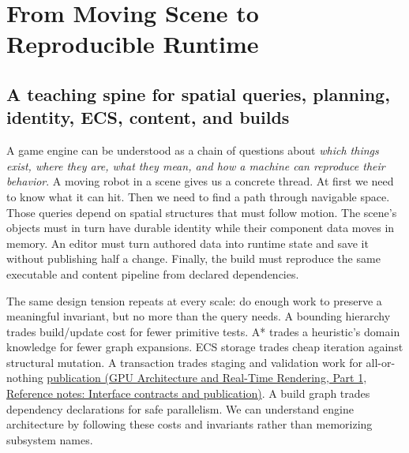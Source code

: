\section{From Moving Scene to Reproducible Runtime}\label{05-engine-i-ch008-from-moving-scene-to-reproducible-runtime}

\hypertarget{05-engine-i-ch008-from-moving-scene-to-reproducible-runtime}{}

\subsection{A teaching spine for spatial queries, planning, identity, ECS, content, and builds}\label{05-engine-i-ch008-a-teaching-spine-for-spatial-queries-planning-identity-ecs-content-and-builds}

\hypertarget{05-engine-i-ch008-a-teaching-spine-for-spatial-queries-planning-identity-ecs-content-and-builds}{}

A game engine can be understood as a chain of questions about \emph{which things exist, where they are, what they mean, and how a machine can reproduce their behavior}. A moving robot in a scene gives us a concrete thread. At first we need to know what it can hit. Then we need to find a path through navigable space. Those queries depend on spatial structures that must follow motion. The scene's objects must in turn have durable identity while their component data moves in memory. An editor must turn authored data into runtime state and save it without publishing half a change. Finally, the build must reproduce the same executable and content pipeline from declared dependencies.

The same design tension repeats at every scale: do enough work to preserve a meaningful invariant, but no more than the query needs. A bounding hierarchy trades build/update cost for fewer primitive tests. A* trades a heuristic's domain knowledge for fewer graph expansions. ECS storage trades cheap iteration against structural mutation. A transaction trades staging and validation work for all-or-nothing \href{../06-GPU-Architecture-and-Real-Time-Rendering-P01/main.pdf\#nameddest=appendix-fdae7ff0a23f}{publication (GPU Architecture and Real-Time Rendering, Part 1, Reference notes: Interface contracts and publication)}. A build graph trades dependency declarations for safe parallelism. We can understand engine architecture by following these costs and invariants rather than memorizing subsystem names.


